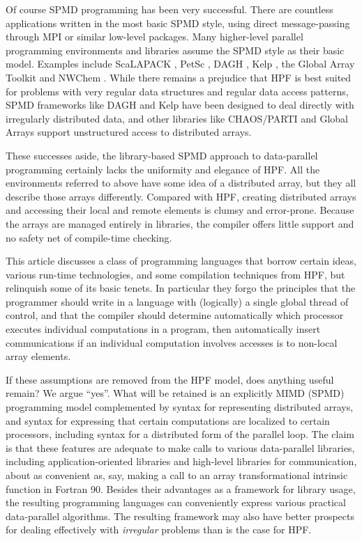 Of course SPMD programming has been very successful.  There are
countless applications written in the most basic SPMD style, using
direct message-passing through MPI \cite{MPIStandard} or similar
low-level packages.  Many higher-level parallel programming
environments and libraries assume the SPMD style as their basic model.
Examples include ScaLAPACK \cite{ScaLAPACK}, PetSc \cite{PETSc1}, DAGH
\cite{HDDA_DAGH}, Kelp \cite{Block_structured}, the Global Array
Toolkit \cite{Global_Arrays} and NWChem \cite{NWChem1}.  While
there remains a prejudice that HPF is best suited for problems with
very regular data structures and regular data access patterns, SPMD
frameworks like DAGH and Kelp have been designed to deal directly with
irregularly distributed data, and other libraries like CHAOS/PARTI
\cite{CHAOS} and Global Arrays support unstructured access to
distributed arrays.  

These successes aside, the library-based SPMD
approach to data-parallel programming certainly lacks the uniformity
and elegance of HPF.  All the environments referred to above have some
idea of a distributed array, but they all describe those arrays
differently.  Compared with HPF, creating distributed arrays and
accessing their local and remote elements is clumsy and error-prone.
Because the arrays are managed entirely in libraries, the compiler
offers little support and no safety net of compile-time checking.

This article discusses a class of programming languages
that borrow certain ideas, various run-time technologies, and some
compilation techniques from HPF, but relinquish some of its basic
tenets.  In particular they forgo the principles that the programmer
should write in a language with (logically) a single global thread of
control, and that the compiler should determine automatically which
processor executes individual computations in a program, then
automatically insert communications if an individual
computation involves accesses is to non-local array elements.

If these assumptions are removed from the HPF model, does anything
useful remain?  We argue ``yes''.  What will be retained is an explicitly
MIMD (SPMD) programming model complemented by syntax for representing
distributed arrays, and syntax for expressing that certain computations
are localized to certain processors, including syntax for a distributed
form of the parallel loop.  The claim is that these features
are adequate to make calls to various data-parallel libraries, including
application-oriented libraries and high-level libraries for
communication, about as convenient as, say, making a call to an array
transformational intrinsic function in Fortran 90.  Besides their
advantages as a framework for library usage, the resulting programming
languages can conveniently express various practical data-parallel
algorithms.  The resulting framework may also have better prospects for
dealing effectively with {\em irregular} problems than is the case for
HPF.

